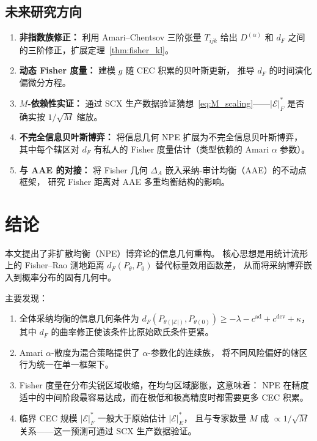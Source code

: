 \documentclass[12pt,a4paper]{article}
\theoremstyle{definition}
\theoremstyle{remark}
\newcommand{\Fisher}{g}
\newcommand{\dalpha}{D^{(\alpha)}}
\begin{document}
\subsection{未来研究方向}

\begin{enumerate}[label=(\textbf{F\arabic*}), leftmargin=*]
    \item \textbf{非指数族修正：} 利用 Amari--Chentsov 三阶张量 $T_{ijk}$ 给出
    $\dalpha$ 和 $d_F$ 之间的三阶修正，扩展定理~\ref{thm:fisher_kl}。
    \item \textbf{动态 Fisher 度量：} 建模 $\Fisher$ 随 CEC 积累的贝叶斯更新，
    推导 $d_F$ 的时间演化偏微分方程。
    \item \textbf{$M$-依赖性实证：} 通过 SCX 生产数据验证猜想~\eqref{eq:M_scaling}——$|\mathcal{E}|^*_F$ 是否确实按 $1/\sqrt{M}$ 缩放。
    \item \textbf{不完全信息贝叶斯博弈：} 将信息几何 NPE 扩展为不完全信息贝叶斯博弈，
    其中每个辖区对 $d_F$ 有私人的 Fisher 度量估计（类型依赖的 Amari $\alpha$ 参数）。
    \item \textbf{与 AAE 的对接：} 将 Fisher 几何 $\Delta_A$ 嵌入采纳-审计均衡（AAE）的不动点框架，
    研究 Fisher 距离对 AAE 多重均衡结构的影响。
\end{enumerate}

\section{结论}

本文提出了非扩散均衡（NPE）博弈论的信息几何重构。
核心思想是用统计流形上的 Fisher--Rao 测地距离 $d_F(P_\theta, P_0)$ 替代标量效用函数差，
从而将采纳博弈嵌入到概率分布的固有几何中。

主要发现：
\begin{enumerate}[label=(\arabic*)]
    \item 全体采纳均衡的信息几何条件为 $d_F(P_{\theta(|\mathcal{E}|)}, P_{\theta(0)}) \geq -\lambda - c^{\text{ad}} + c^{\text{dev}} + \kappa$，
    其中 $d_F$ 的曲率修正使该条件比原始欧氏条件更紧。
    \item Amari $\alpha$-散度为混合策略提供了 $\alpha$-参数化的连续族，
    将不同风险偏好的辖区行为统一在单一框架下。
    \item Fisher 度量在分布尖锐区域收缩，在均匀区域膨胀，这意味着：
    NPE 在精度适中的中间阶段最容易达成，而在极低和极高精度时都需要更多 CEC 积累。
    \item 临界 CEC 规模 $|\mathcal{E}|^*_F$ 一般大于原始估计 $|\mathcal{E}|^*_E$，
    且与专家数量 $M$ 成 $\propto 1/\sqrt{M}$ 关系——这一预测可通过 SCX 生产数据验证。
\end{enumerate}
\end{document}
